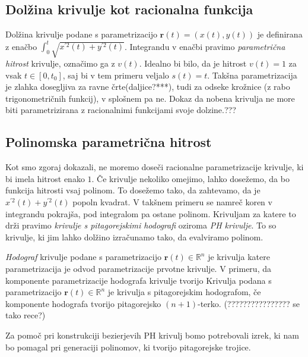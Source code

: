\documentclass[isrm2, tisk]{fmfdelo}
\newcommand{\R}{\mathbb R}
\begin{document}
    \subsection{Dolžina krivulje kot racionalna funkcija}
    Dolžina krivulje podane s parametrizacijo  $\mathbf{r}(t) = \left(x(t),y(t)\right)$ je definirana z enačbo $\int_0^t \sqrt {x^{'2}(t)+y^{'2}(t)}$.
    Integrandu v enačbi pravimo \textit{parametrična hitrost} krivulje, označimo ga z $v(t)$.
    Idealno bi bilo, da je hitrost $v(t) = 1$ za vsak $t\in [0,t_0]$, saj bi v tem primeru veljalo $s(t)=t$.
    Takšna parametrizacija je zlahka dosegljiva za ravne črte(daljice?***), tudi za odseke krožnice (z rabo trigonometričnih funkcij), v splošnem pa ne.
    Dokaz da nobena krivulja ne more biti parametrizirana z racionalnimi funkcijami svoje dolzine.???

    \subsection{Polinomska parametrična hitrost}
    Kot smo zgoraj dokazali, ne moremo doseči racionalne parametrizacije krivulje, ki bi imela hitrost enako $1$.
    Če krivulje nekoliko omejimo, lahko dosežemo, da bo funkcija hitrosti vsaj polinom.
    To dosežemo tako, da zahtevamo, da je $x^{'2}(t)+y^{'2}(t)$ popoln kvadrat.
    V takšnem primeru se namreč koren v integrandu pokrajša, pod integralom pa ostane polinom.
    Krivuljam za katere to drži pravimo \textit{krivulje s pitagorejskimi hodografi} oziroma \textit{PH krivulje}.
    To so krivulje, ki jim lahko dolžino izračunamo tako, da evalviramo polinom.


    \textit{Hodograf} krivulje podane s parametrizacijo $\mathbf{r}(t)\in \R^n$ je krivulja katere parametrizacija je odvod parametrizacije prvotne krivulje.
    V primeru, da komponente parametrizacije hodografa krivulje tvorijo
    Krivulja podana s parametrizacijo $\mathbf{r}(t)\in \R^n$ je krivulja s pitagorejskim hodografom, če komponente hodografa tvorijo pitagorejsko $(n+1)$-terko. (???????????????? se tako rece?)

    Za pomoč pri konstrukciji bezierjevih PH krivulj bomo potrebovali izrek, ki nam bo pomagal pri generaciji polinomov, ki tvorijo pitagorejske trojice.
\end{document}
